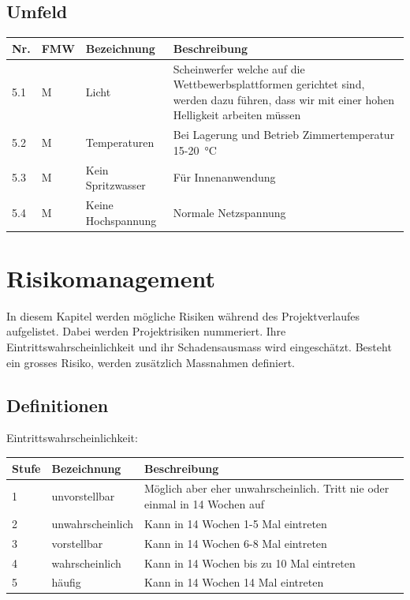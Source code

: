 \documentclass[a4paper]{report}
\begin{document}
\section{Umfeld}
\begin{tabular}{|p{}|p{}|p{}|p{}|}
	\hline
	\textbf{Nr.} & \textbf{FMW\footnotemark} & \textbf{Bezeichnung} & \textbf{Beschreibung} \\
	\hline
	5.1 & M & Licht & Scheinwerfer welche auf die Wettbewerbsplattformen gerichtet sind, werden dazu führen, dass wir mit einer hohen Helligkeit arbeiten müssen \\
	\hline
	5.2 & M & Temperaturen & Bei Lagerung und Betrieb Zimmertemperatur 15-\SI{20}{\degreeCelsius}\\
	\hline
	5.3 & M & Kein Spritzwasser & Für Innenanwendung\\
	\hline
	5.4 & M & Keine Hochspannung & Normale Netzspannung\\
	\hline
\end{tabular}

\chapter{Risikomanagement}
In diesem Kapitel werden mögliche Risiken während des Projektverlaufes aufgelistet. Dabei werden Projektrisiken nummeriert. Ihre Eintrittswahrscheinlichkeit und ihr Schadensausmass wird eingeschätzt. Besteht ein grosses Risiko, werden zusätzlich Massnahmen definiert.

\section{Definitionen}

\vspace{1em}
\noindent
Eintrittswahrscheinlichkeit:

\vspace{1em}
\noindent
\begin{tabular}{|p{}|p{}|p{}|}
	\hline
	\textbf{Stufe} & \textbf{Bezeichnung} & \textbf{Beschreibung} \\
	\hline
	1 & unvorstellbar & Möglich aber eher unwahrscheinlich. Tritt nie oder einmal in 14 Wochen auf \\
	\hline
	2 & unwahrscheinlich & Kann in 14 Wochen 1-5 Mal eintreten\\
	\hline
	3 & vorstellbar & Kann in 14 Wochen 6-8 Mal eintreten \\
	\hline
	4 & wahrscheinlich & Kann in 14 Wochen bis zu 10 Mal eintreten \\
	\hline
	5 & häufig & Kann in 14 Wochen 14 Mal eintreten\\
	\hline
\end{tabular}
\end{document}
